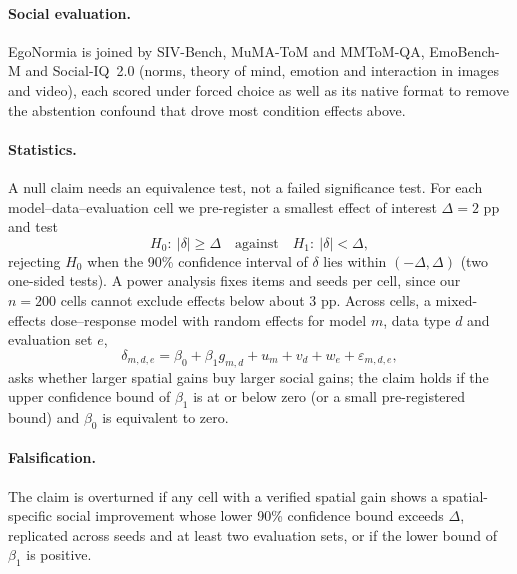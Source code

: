 \paragraph{Social evaluation.}
EgoNormia is joined by SIV-Bench, MuMA-ToM and MMToM-QA, EmoBench-M and Social-IQ~2.0 (norms, theory of mind, emotion and interaction in images and video), each scored under forced choice as well as its native format to remove the abstention confound that drove most condition effects above.

\paragraph{Statistics.}
A null claim needs an equivalence test, not a failed significance test. For each model--data--evaluation cell we pre-register a smallest effect of interest $\Delta=2$ pp and test
\begin{equation}
H_0:\ |\delta|\ge\Delta\quad\text{against}\quad H_1:\ |\delta|<\Delta,
\end{equation}
rejecting $H_0$ when the 90\% confidence interval of $\delta$ lies within $(-\Delta,\Delta)$ (two one-sided tests). A power analysis fixes items and seeds per cell, since our $n{=}200$ cells cannot exclude effects below about 3 pp. Across cells, a mixed-effects dose--response model with random effects for model $m$, data type $d$ and evaluation set $e$,
\begin{equation}
\delta_{m,d,e}=\beta_0+\beta_1 g_{m,d}+u_m+v_d+w_e+\varepsilon_{m,d,e},
\end{equation}
asks whether larger spatial gains buy larger social gains; the claim holds if the upper confidence bound of $\beta_1$ is at or below zero (or a small pre-registered bound) and $\beta_0$ is equivalent to zero.

\paragraph{Falsification.}
The claim is overturned if any cell with a verified spatial gain shows a spatial-specific social improvement whose lower 90\% confidence bound exceeds $\Delta$, replicated across seeds and at least two evaluation sets, or if the lower bound of $\beta_1$ is positive.
